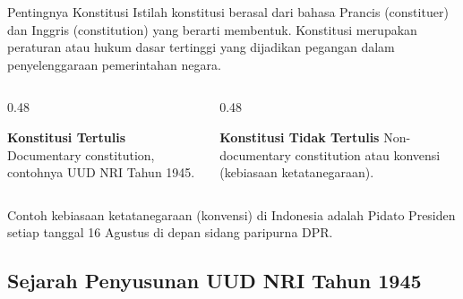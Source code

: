 \documentclass[11pt, aspectratio=169]{beamer}
\begin{document}
\begin{frame}{Pentingnya Konstitusi}
    \small Istilah konstitusi berasal dari bahasa Prancis (constituer) dan Inggris (constitution) yang berarti membentuk. Konstitusi merupakan peraturan atau hukum dasar tertinggi yang dijadikan pegangan dalam penyelenggaraan pemerintahan negara.

    \vspace{4mm}
    \begin{columns}[T]
        \begin{column}{0.48\textwidth}
            \begin{block}{\centering\textbf{Konstitusi Tertulis}}
                \footnotesize Documentary constitution, contohnya UUD NRI Tahun 1945.
            \end{block}
        \end{column}
        \begin{column}{0.48\textwidth}
            \begin{block}{\centering\textbf{Konstitusi Tidak Tertulis}}
                \footnotesize Non-documentary constitution atau konvensi (kebiasaan ketatanegaraan).
            \end{block}
        \end{column}
    \end{columns}
    \vspace{4mm}
    \footnotesize Contoh kebiasaan ketatanegaraan (konvensi) di Indonesia adalah Pidato Presiden setiap tanggal 16 Agustus di depan sidang paripurna DPR.
\end{frame}

\subsection{Sejarah Penyusunan UUD NRI Tahun 1945}
\end{document}
